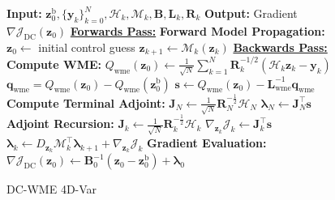 \documentclass[final,1p,times]{elsarticle}
\begin{document}
\begin{figure}[htbp]
\begin{minipage}[t]{0.48\textwidth}
\begin{algorithm}[H]
\begin{algorithmic}[1]
athbf{q}_{k}\right] + (\nabla {}_k)^\top \boldsymbol{\lambda}_{k+1}$
\EndFor
\Statex
\Statex \textbf{Gradient Evaluation:}
\State $\nabla {}_{}(_0) \gets {}_0^{-1} (_0 - _0^{}) - \boldsymbol{\lambda}_0$
\end{algorithmic}
\end{algorithm}
\end{minipage}%
\hfill
\begin{minipage}[t]{0.48\textwidth}
\begin{algorithm}[H]
\caption{DC-WME 4D-Var}
\begin{algorithmic}[1]
\State \textbf{Input:} $ _0^{}, \{_k\}_{k=0}^N , _k, _k, , _k, _{k}$
\State \textbf{Output:} Gradient $ \nabla {}_{}(_0) $
\Statex
\Statex \textbf{\large{\underline{Forwards Pass:}}}
\Statex
\Statex \textbf{Forward Model Propagation:}
\State $_0 \gets$ initial control guess
    \State $_{k+1} \gets {}_k(_k)$
\EndFor
\Statex
\Statex \textbf{\large{\underline{Backwards Pass:}}}
\Statex
\Statex \textbf{Compute WME:}
\State $Q_{}(_0) \gets {} \sum\limits_{k=1}^N _{k}^{-1/2} \left(_k _k - _k\right)$ 
\State $_{} = Q_{}(_0) - Q_{}(_0^{})$
\State $ \gets Q_{}\left(_0\right) - _{}^{-1}_{}$
\Statex
\Statex \textbf{Compute Terminal Adjoint:}
\State $_N \gets {}  _{N}^{-}_N$
\State $\boldsymbol{\lambda}_{N} \gets {}_N^\top {}$
\Statex
\Statex \textbf{Adjoint Recursion:}
    \State $_k \gets {}  _{k}^{-}_k$
    \State $\nabla_{_k} _k \gets {}_k^\top {}$
    \State $\boldsymbol{\lambda}_k \gets D_{_k} _k^\top \boldsymbol{\lambda}_{k+1} + \nabla_{_k} _k$
\EndFor
\Statex
\Statex \textbf{Gradient Evaluation:}
\State $\nabla {}_{}(_0) \gets {}_0^{-1} (_0 - _0^{}) + \boldsymbol{\lambda}_0$
\end{algorithmic}
\end{algorithm}
\end{minipage}
\end{figure}



  
 
\end{document}
